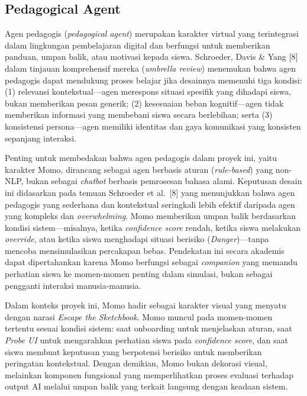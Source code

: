 \documentclass[10pt,twoside,openright]{report}
\begin{document}
\subsection{Pedagogical Agent}
\label{subsec:pedagogical-agent}

Agen pedagogis (\textit{pedagogical agent}) merupakan karakter virtual yang terintegrasi dalam lingkungan pembelajaran digital dan berfungsi untuk memberikan panduan, umpan balik, atau motivasi kepada siswa. Schroeder, Davis \& Yang [8] dalam tinjauan komprehensif mereka (\textit{umbrella review}) menemukan bahwa agen pedagogis dapat mendukung proses belajar jika desainnya memenuhi tiga kondisi: (1) relevansi kontekstual---agen merespons situasi spesifik yang dihadapi siswa, bukan memberikan pesan generik; (2) kesesuaian beban kognitif---agen tidak memberikan informasi yang membebani siswa secara berlebihan; serta (3) konsistensi persona---agen memiliki identitas dan gaya komunikasi yang konsisten sepanjang interaksi.

Penting untuk membedakan bahwa agen pedagogis dalam proyek ini, yaitu karakter Momo, dirancang sebagai agen berbasis aturan (\textit{rule-based}) yang non-NLP, bukan sebagai \textit{chatbot} berbasis pemrosesan bahasa alami. Keputusan desain ini didasarkan pada temuan Schroeder et al.\ [8] yang menunjukkan bahwa agen pedagogis yang sederhana dan kontekstual seringkali lebih efektif daripada agen yang kompleks dan \textit{overwhelming}. Momo memberikan umpan balik berdasarkan kondisi sistem---misalnya, ketika \textit{confidence score} rendah, ketika siswa melakukan \textit{override}, atau ketika siswa menghadapi situasi berisiko (\textit{Danger})---tanpa mencoba mensimulasikan percakapan bebas. Pendekatan ini secara akademis dapat dipertahankan karena Momo berfungsi sebagai \textit{companion} yang memandu perhatian siswa ke momen-momen penting dalam simulasi, bukan sebagai pengganti interaksi manusia-manusia.

Dalam konteks proyek ini, Momo hadir sebagai karakter visual yang menyatu dengan narasi \textit{Escape the Sketchbook}. Momo muncul pada momen-momen tertentu sesuai kondisi sistem: saat onboarding untuk menjelaskan aturan, saat \textit{Probe UI} untuk mengarahkan perhatian siswa pada \textit{confidence score}, dan saat siswa membuat keputusan yang berpotensi berisiko untuk memberikan peringatan kontekstual. Dengan demikian, Momo bukan dekorasi visual, melainkan komponen fungsional yang memperlihatkan proses evaluasi terhadap output AI melalui umpan balik yang terkait langsung dengan keadaan sistem.
\end{document}
